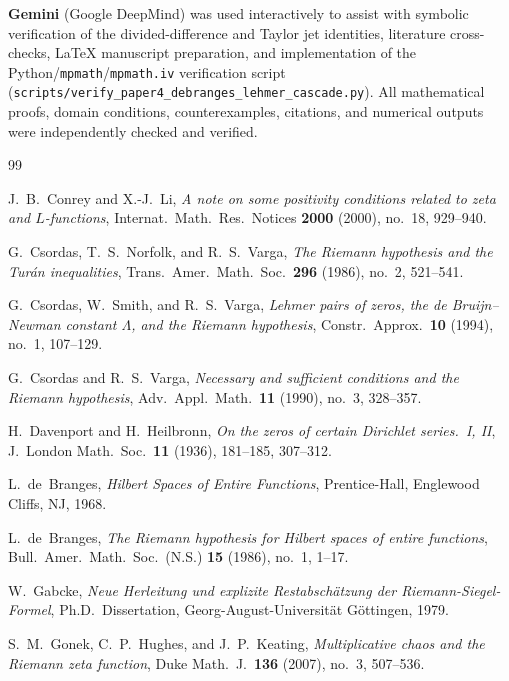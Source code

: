 \documentclass[11pt,reqno]{amsart}
\theoremstyle{definition}
\theoremstyle{remark}
\numberwithin{equation}{section}
\begin{document}
\textbf{Gemini} (Google DeepMind) was used interactively to assist with symbolic verification of the divided-difference and Taylor jet identities, literature cross-checks, \LaTeX{} manuscript preparation, and implementation of the Python/\texttt{mpmath}/\texttt{mpmath.iv} verification script (\nolinkurl{scripts/verify_paper4_debranges_lehmer_cascade.py}). All mathematical proofs, domain conditions, counterexamples, citations, and numerical outputs were independently checked and verified.

\begin{thebibliography}{99}

J.~B.~Conrey and X.-J.~Li,
\emph{A note on some positivity conditions related to zeta and $L$-functions},
Internat.\ Math.\ Res.\ Notices \textbf{2000} (2000), no.~18, 929--940.

G.~Csordas, T.~S.~Norfolk, and R.~S.~Varga,
\emph{The Riemann hypothesis and the Tur\'an inequalities},
Trans.\ Amer.\ Math.\ Soc.\ \textbf{296} (1986), no.~2, 521--541.

G.~Csordas, W.~Smith, and R.~S.~Varga,
\emph{Lehmer pairs of zeros, the de Bruijn--Newman constant $\Lambda$, and the Riemann hypothesis},
Constr.\ Approx.\ \textbf{10} (1994), no.~1, 107--129.

G.~Csordas and R.~S.~Varga,
\emph{Necessary and sufficient conditions and the Riemann hypothesis},
Adv.\ Appl.\ Math.\ \textbf{11} (1990), no.~3, 328--357.

H.~Davenport and H.~Heilbronn,
\emph{On the zeros of certain Dirichlet series.~I, II},
J.\ London Math.\ Soc.\ \textbf{11} (1936), 181--185, 307--312.

L.~de~Branges,
\emph{Hilbert Spaces of Entire Functions},
Prentice-Hall, Englewood Cliffs, NJ, 1968.

L.~de~Branges,
\emph{The Riemann hypothesis for Hilbert spaces of entire functions},
Bull.\ Amer.\ Math.\ Soc.\ (N.S.) \textbf{15} (1986), no.~1, 1--17.

W.~Gabcke,
\emph{Neue Herleitung und explizite Restabsch\"atzung der Riemann-Siegel-Formel},
Ph.D.\ Dissertation, Georg-August-Universit\"at G\"ottingen, 1979.

S.~M.~Gonek, C.~P.~Hughes, and J.~P.~Keating,
\emph{Multiplicative chaos and the Riemann zeta function},
Duke Math.\ J.\ \textbf{136} (2007), no.~3, 507--536.


\end{thebibliography}
\end{document}
